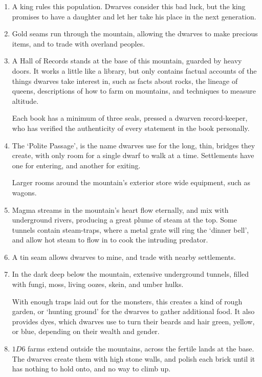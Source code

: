 \begin{multicols}{2}
\begin{exampletext}
\end{exampletext}

\begin{enumerate}
  \item
  A king rules this population.
  Dwarves consider this bad luck, but the king promises to have a daughter and let her take his place in the next generation.%
  \item
  Gold seams run through the mountain, allowing the dwarves to make precious items, and to trade with overland peoples.
  \item
  A Hall of Records stands at the base of this mountain, guarded by heavy doors.
  It works a little like a library, but only contains factual accounts of the things dwarves take interest in, such as facts about rocks, the lineage of queens, descriptions of how to farm on mountains, and techniques to measure altitude.

  Each book has a minimum of three seals, pressed a dwarven record-keeper, who has verified the authenticity of every statement in the book personally.
  \item
  The `Polite Passage', is the name dwarves use for the long, thin, bridges they create, with only room for a single dwarf to walk at a time.
  Settlements have one for entering, and another for exiting.

  Larger rooms around the mountain's exterior store wide equipment, such as wagons.
  \item
  Magma streams in the mountain's heart flow eternally, and mix with underground rivers, producing a great plume of steam at the top.
  Some tunnels contain steam-traps, where a metal grate will ring the `dinner bell', and allow hot steam to flow in to cook the intruding predator.
  \item
  A tin seam allows dwarves to mine, and trade with nearby settlements.
  \item
  In the dark \gls{deep} below the mountain, extensive underground tunnels, filled with fungi, moss, living oozes, skein, and umber hulks.

  With enough traps laid out for the monsters, this creates a kind of rough garden, or `hunting ground' for the dwarves to gather additional food.
  It also provides dyes, which dwarves use to turn their beards and hair green, yellow, or blue, depending on their wealth and gender.\index[Dye]
  \item
  $1D6$ farms extend outside the mountains, across the fertile lands at the base.
  The dwarves create them with high stone walls, and polish each brick until it has nothing to hold onto, and no way to climb up.


\end{enumerate}
\end{multicols}
